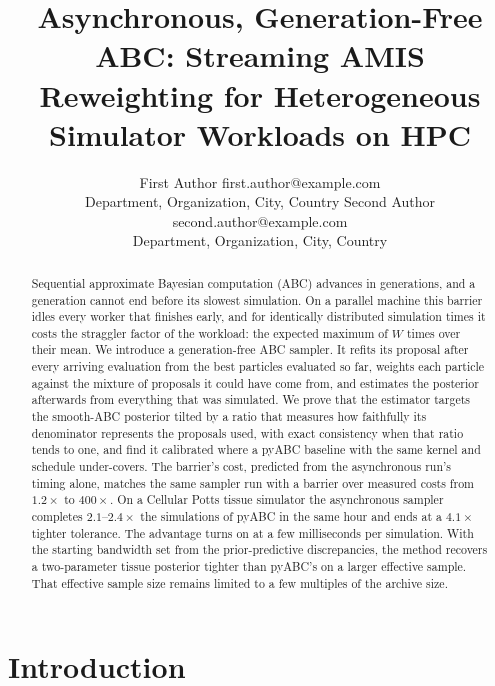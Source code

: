 \documentclass[10pt]{article}
\title{Asynchronous, Generation-Free ABC: Streaming AMIS Reweighting for Heterogeneous Simulator Workloads on HPC}
\author{\name First Author \email first.author@example.com \\
      \addr Department, Organization, City, Country
      \AND
      \name Second Author \email second.author@example.com \\
      \addr Department, Organization, City, Country}
\theoremstyle{plain}
\theoremstyle{definition}
\begin{document}
\maketitle

\begin{abstract}
Sequential approximate Bayesian computation (ABC) advances in generations, and a generation cannot end before its slowest simulation. On a parallel machine this barrier idles every worker that finishes early, and for identically distributed simulation times it costs the straggler factor of the workload: the expected maximum of $W$ times over their mean. We introduce a generation-free ABC sampler. It refits its proposal after every arriving evaluation from the best particles evaluated so far, weights each particle against the mixture of proposals it could have come from, and estimates the posterior afterwards from everything that was simulated. We prove that the estimator targets the smooth-ABC posterior tilted by a ratio that measures how faithfully its denominator represents the proposals used, with exact consistency when that ratio tends to one, and find it calibrated where a pyABC baseline with the same kernel and schedule under-covers. The barrier's cost, predicted from the asynchronous run's timing alone, matches the same sampler run with a barrier over measured costs from $1.2\times$ to $400\times$. On a Cellular Potts tissue simulator the asynchronous sampler completes $2.1$--$2.4\times$ the simulations of pyABC in the same hour and ends at a $4.1\times$ tighter tolerance. The advantage turns on at a few milliseconds per simulation. With the starting bandwidth set from the prior-predictive discrepancies, the method recovers a two-parameter tissue posterior tighter than pyABC's on a larger effective sample. That effective sample size remains limited to a few multiples of the archive size.
\end{abstract}

\section{Introduction}\label{sec:introduction}
\end{document}

